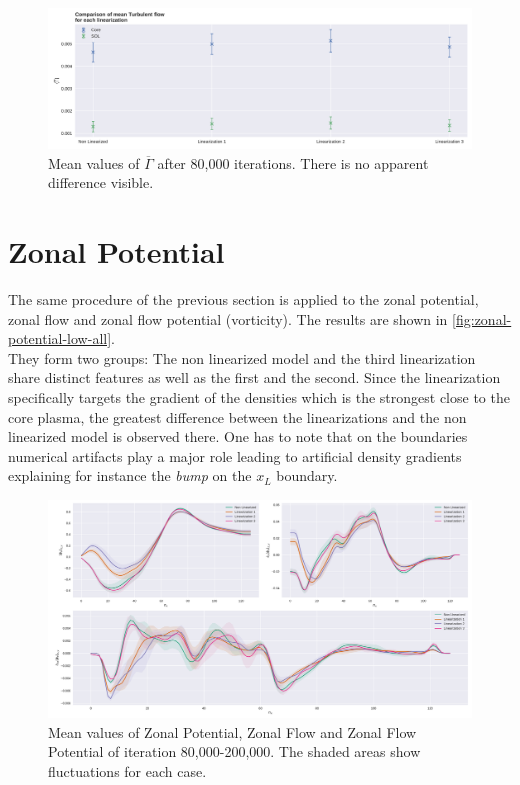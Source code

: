 \documentclass[master.tex]{subfiles}
\newcommand{\Tflow}[0]{\overline{\Gamma}}
\begin{document}
\begin{figure}[!htbp]
    \includegraphics[width=\linewidth]{pdfs/turbulent-flow-low-means.pdf}
    \caption{Mean values of $\Tflow$ after 80,000 iterations. There is no apparent difference visible.}
    \label{fig:turbulent-flow-low-means}
\end{figure}

\section{Zonal Potential}

The same procedure of the previous section is applied to the zonal potential, zonal flow and zonal flow potential (vorticity). The results are shown in \autoref{fig:zonal-potential-low-all}.\\
They form two groups: The non linearized model and the third linearization share distinct features as well as the first and the second. Since the linearization specifically targets the gradient of the densities which is the strongest close to the core plasma, the greatest difference between the linearizations and the non linearized model is observed there. One has to note that on the boundaries numerical artifacts play a major role leading to artificial density gradients explaining for instance the \textit{bump} on the $x_L$ boundary.

\begin{figure}[!htbp]
    \includegraphics[width=\linewidth]{pdfs/zonal_potential_low.pdf}
    \caption{Mean values of Zonal Potential, Zonal Flow and Zonal Flow Potential of iteration 80,000-200,000. The shaded areas show fluctuations for each case.}
    \label{fig:zonal-potential-low-all}
\end{figure}
\end{document}
